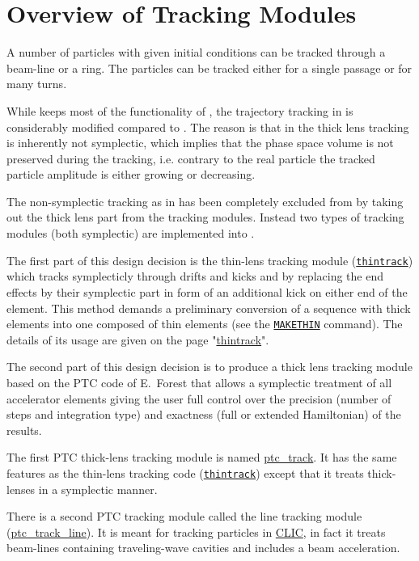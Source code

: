 
\chapter{Overview of \madx Tracking Modules}

A number of particles with given initial conditions can be tracked
through a beam-line or a ring. The particles can be tracked either for a
single passage or for many turns.  


While \madx keeps most of the functionality of \madeight, the
trajectory tracking in \madx is considerably modified compared to
\madeight. 
The reason is that in \madeight the thick lens tracking is inherently not
symplectic, which implies that the phase space volume is not preserved
during the tracking, i.e. contrary to the real particle the tracked
particle amplitude is either growing or decreasing. 


The non-symplectic tracking as in \madeight has been completely excluded
from \madx by taking out the thick lens part from the tracking
modules. Instead two types of tracking modules (both symplectic) are
implemented into \madx. 


The first part of this design decision is the thin-lens tracking module
(\texttt{\href{../thintrack/thintrack.html}{thintrack}})  which tracks
symplecticly through drifts and kicks and by replacing the end effects
by their symplectic part in form of an additional kick on either  end of
the element. This method demands a preliminary conversion of a sequence
with thick elements into one composed of thin elements (see the
\texttt{\href{../makethin/makethin.html}{MAKETHIN}} command). The
details of its usage are given on the page
"\href{../thintrack/thintrack.html}{thintrack}". 


The second part of this design decision is to produce a thick lens
tracking module based on the PTC code of E.~Forest that
allows a symplectic treatment of all accelerator elements giving the
user full control over the precision (number of steps and integration
type) and exactness (full or extended Hamiltonian) of the results. 


The first PTC thick-lens tracking module is named
\href{../ptc_track/ptc_track.html}{ptc\_track}. 
It has the same features as the thin-lens tracking code
(\texttt{\href{../thintrack/thintrack.html}{thintrack}}) except that it
treats thick-lenses in a symplectic manner. 


There is a second PTC tracking module called the line tracking module
(\href{../ptc_track_line/ptc_track_line.html}{ptc\_track\_line}). It is
meant for tracking particles in
\href{http://clic-study.web.cern.ch/CLIC-Study/}{CLIC}, in fact it
treats beam-lines containing traveling-wave cavities and includes a beam
acceleration. 


